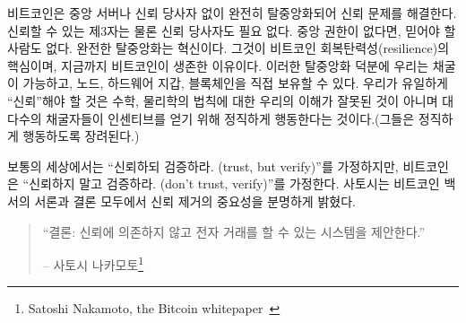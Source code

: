 \begin{comment}
	Bitcoin solves the problem of trust by being completely decentralized,
	with no central server or trusted parties. Not even trusted \textit{third}
	parties, but trusted parties, period. When there is no central
	authority, there simply \textit{is} no-one to trust. Complete decentralization
	is the innovation. It is the root of Bitcoin's resilience, the reason
	why it is still alive. Decentralization is also why we have mining,
	nodes, hardware wallets, and yes, the blockchain. The only thing you
	have to \enquote{trust} is that our understanding of mathematics and physics
	isn't totally off and that the majority of miners act honestly (which
	they are incentivized to do).
\end{comment}
비트코인은 중앙 서버나 신뢰 당사자 없이 완전히 탈중앙화되어 신뢰 문제를 해결한다.
신뢰할 수 있는 제3자는 물론 신뢰 당사자도 필요 없다.
중앙 권한이 없다면, 믿어야 할 사람도 없다.
완전한 탈중앙화는 혁신이다. 
그것이 비트코인 회복탄력성(resilience)의 핵심이며, 지금까지 비트코인이 생존한 이유이다.
이러한 탈중앙화 덕분에 우리는 채굴이 가능하고, 노드, 하드웨어 지갑, 블록체인을 직접 보유할 수 있다. 
우리가 유일하게 \enquote{신뢰}해야 할 것은 수학, 물리학의 법칙에 대한 우리의 이해가 잘못된 것이 아니며
대다수의 채굴자들이 인센티브를 얻기 위해 정직하게 행동한다는 것이다.(그들은 정직하게 행동하도록 장려된다.)

\begin{comment}
	While the regular world operates under the assumption of \textit{\enquote{trust,
			but verify,}} Bitcoin operates under the assumption of \textit{\enquote{don't
			trust, verify.}} Satoshi made the importance of removing trust very clear in
	both the introduction as well as the conclusion of the Bitcoin whitepaper.
\end{comment}
보통의 세상에서는 \enquote{신뢰하되 검증하라. (trust, but verify)}를 가정하지만,
비트코인은 \enquote{신뢰하지 말고 검증하라. (don't trust, verify)}를 가정한다.
사토시는 비트코인 백서의 서론과 결론 모두에서 신뢰 제거의 중요성을 분명하게 밝혔다.

\begin{quotation}\begin{samepage}
		\enquote{결론: 신뢰에 의존하지 않고 전자 거래를 할 수 있는 시스템을 제안한다.}
		\begin{flushright} -- 사토시 나카모토\footnote{Satoshi Nakamoto, the Bitcoin whitepaper~\cite{whitepaper}}
\end{flushright}\end{samepage}\end{quotation}

